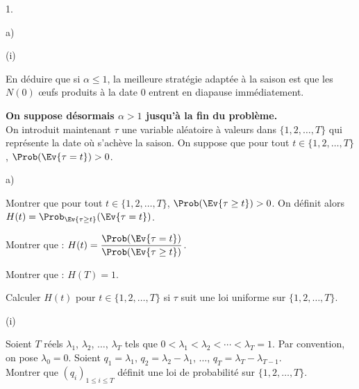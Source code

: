 \documentclass[11pt]{article}%
\begin{document}
\begin{noliste}{1.}
\begin{noliste}{a)}
\begin{nonoliste}{(i)}
      
      
      

      
      \item En déduire que si $\alpha \leq 1$, la meilleure stratégie 
      adaptée à la saison est que les $N(0)$ {\oe}ufs produits à la date
      $0$ entrent en diapause immédiatement.
      
      

    \end{nonoliste}
  \end{noliste}
  
  \item {\bf On suppose désormais $\alpha >1$ jusqu'à la fin du 
  problème.}\\
  On introduit maintenant $\tau$ une variable aléatoire à valeurs dans 
  $\{1,2, \ldots, T\}$ qui représente la date où s'achève la saison. On 
  suppose que pour tout $t \in \{1,2, \ldots, T\}$, $\Prob(
  \Ev{\tau=t}) >0$.
  \begin{noliste}{a)}
    \setlength{\itemsep}{2mm}
    \item Montrer que pour tout $t\in \{1,2, \ldots, T\}$, $\Prob(
    \Ev{\tau \geq t}) >0$. On définit alors $H(t)= \Prob_{\Ev{\tau \geq 
    t}}(\Ev{\tau =t})$.
    
    

    
    \item Montrer que : $H(t)= \dfrac{\Prob(\Ev{\tau=t})}{\Prob(\Ev{\tau
    \geq t})}$.
    
    

    
    \item Montrer que : $H(T)=1$.
    
    
    
    

    
    \item Calculer $H(t)$ pour $t\in \{1,2, \ldots, T\}$ si $\tau$ 
    suit une loi uniforme sur $\{1,2, \ldots, T\}$.
    
    

    
    \item 
    \begin{nonoliste}{(i)}
      \item Soient $T$ réels $\lambda_1$, $\lambda_2$, $\ldots$, 
      $\lambda_T$ tels que $0 < \lambda_1 < \lambda_2 < \cdots < 
      \lambda_T=1$. Par convention, on pose $\lambda_0=0$. Soient 
      $q_1=\lambda_1$, $q_2=\lambda_2-\lambda_1$, $\ldots$, 
      $q_T=\lambda_T - \lambda_{T-1}$.\\
      Montrer que $(q_i)_{1\leq i \leq T}$ définit une loi de 
      probabilité sur $\{1,2, \ldots, T\}$.
      

\end{nonoliste}
\end{noliste}
\end{noliste}
\end{document}
